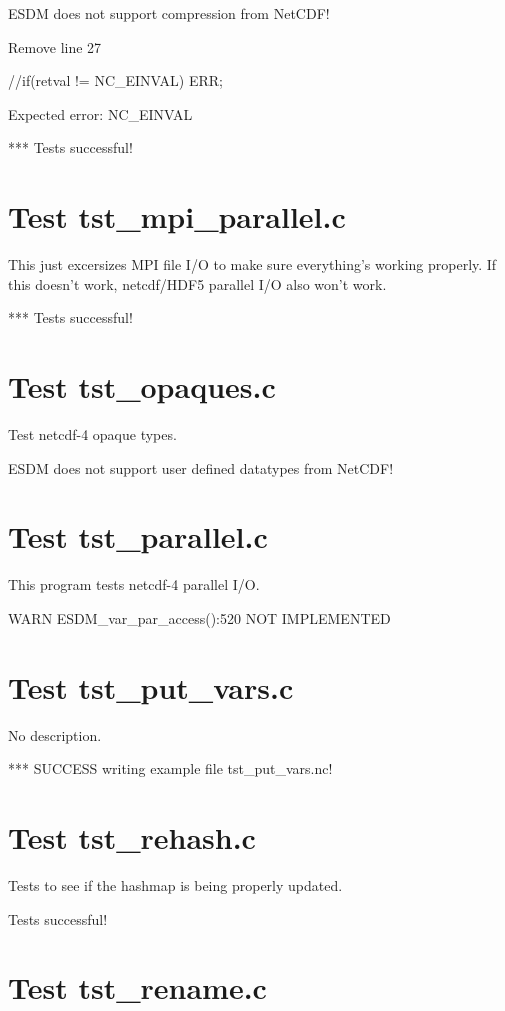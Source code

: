 ESDM does not support compression from NetCDF!

Remove line 27

//if(retval != NC\_EINVAL) ERR;

Expected error: NC\_EINVAL

*** Tests successful!

\section{Test tst\_mpi\_parallel.c}

This just excersizes MPI file I/O to make sure everything's working properly. If this doesn't work, netcdf/HDF5 parallel I/O also won't work.

*** Tests successful!

\section{Test tst\_opaques.c}

Test netcdf-4 opaque types.

ESDM does not support user defined datatypes from NetCDF!

\section{Test tst\_parallel.c}

This program tests netcdf-4 parallel I/O.

WARN ESDM\_var\_par\_access():520 NOT IMPLEMENTED

\section{Test tst\_put\_vars.c}

No description.

*** SUCCESS writing example file tst\_put\_vars.nc!

\section{Test tst\_rehash.c}

Tests to see if the hashmap is being properly updated.

Tests successful!

\section{Test tst\_rename.c}

